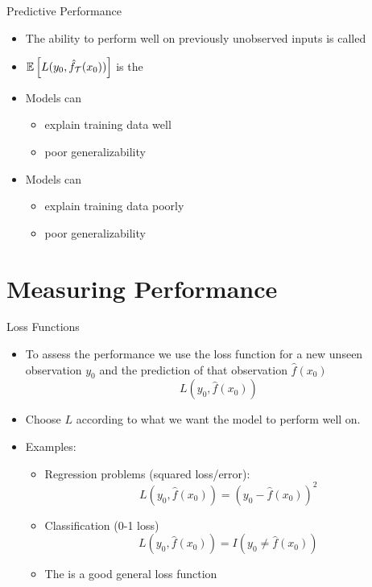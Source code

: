 \documentclass[10pt]{beamer}
\begin{document}
\begin{frame}{Predictive Performance}
\begin{itemize}
\item The ability to perform well on previously unobserved inputs is called 
\item $\operatorname{\mathbb{E}}\left[L(y_0,\hat{f}_\mathcal{T}(x_0))\right]$ is the 
\pause
\item Models can %
\begin{itemize}
\item explain training data well
\item poor generalizability
\end{itemize}
\pause
\item Models can 
\begin{itemize}
\item explain training data poorly
\item poor generalizability
\end{itemize}
\end{itemize}

\end{frame}

\section{Measuring Performance}
\frame{\sectionpage}

\begin{frame}{Loss Functions}



\begin{itemize}

\item To assess the performance we use the loss function for a new unseen observation $y_0$ and the prediction of that observation $\hat{f}(x_0)$
\[
L(y_0,\hat{f}(x_0))
\]
\pause
\item Choose $L$ according to what we want the model to perform well on.\pause
\item Examples:
\begin{itemize}
\item Regression problems (squared loss/error):
\[
    L(y_0,\hat{f}(x_0)) = (y_0 - \hat{f}(x_0))^2
\]
\pause
\item Classification (0-1 loss)
\[
    L(y_0,\hat{f}(x_0)) = I(y_0 \ne \hat{f}(x_0))
\]
\pause
\item The  is a good general loss function
\end{itemize}


\end{itemize}

\end{frame}
\end{document}
